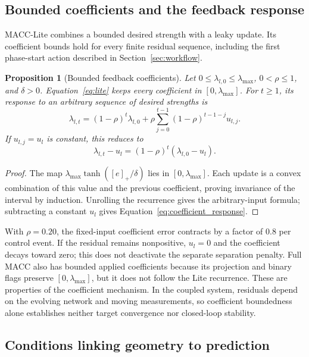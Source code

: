 \documentclass[10pt,a4paper,twocolumn]{article}
\newtheorem{proposition}{Proposition}
\begin{document}
\subsection{Bounded coefficients and the feedback response}
\label{sec:analysis_control}

MACC-Lite combines a bounded desired strength with a leaky update.
Its coefficient bounds hold for every finite residual sequence,
including the first phase-start action described in Section~\ref{sec:workflow}.

\begin{proposition}[Bounded feedback coefficients]\label{prop:bounded}
Let $0\le\lambda_{l,0}\le\lambda_{\max}$, $0<\rho\le1$, and
$\delta>0$. Equation~\eqref{eq:lite} keeps every coefficient in
$[0,\lambda_{\max}]$. For $t\ge1$, its response to an arbitrary
sequence of desired strengths is
\[
 \lambda_{l,t}=(1-\rho)^t\lambda_{l,0}
 +\rho\sum_{j=0}^{t-1}(1-\rho)^{t-1-j}u_{l,j}.
\]
If $u_{l,j}=u_l$ is constant, this reduces to
\begin{equation}
 \lambda_{l,t}-u_l=(1-\rho)^t(\lambda_{l,0}-u_l).
 \label{eq:coefficient_response}
\end{equation}
\end{proposition}
\begin{proof}
The map $\lambda_{\max}\tanh([e]_+/\delta)$ lies in
$[0,\lambda_{\max}]$. Each update is a convex combination
of this value and the previous coefficient, proving invariance
of the interval by induction. Unrolling the recurrence gives
the arbitrary-input formula; subtracting a constant $u_l$
gives Equation~\eqref{eq:coefficient_response}.
\end{proof}

With $\rho=0.20$, the fixed-input coefficient error contracts by
a factor of $0.8$ per control event. If the residual remains
nonpositive, $u_l=0$ and the coefficient decays toward zero;
this does not deactivate the separate separation penalty.
Full MACC also has bounded applied coefficients because its
projection and binary flags preserve $[0,\lambda_{\max}]$,
but it does not follow the Lite recurrence.
These are properties of the coefficient mechanism. In the coupled
system, residuals depend on the evolving network and moving
measurements, so coefficient boundedness alone establishes
neither target convergence nor closed-loop stability.

\subsection{Conditions linking geometry to prediction}
\label{sec:analysis_prediction}
\end{document}
